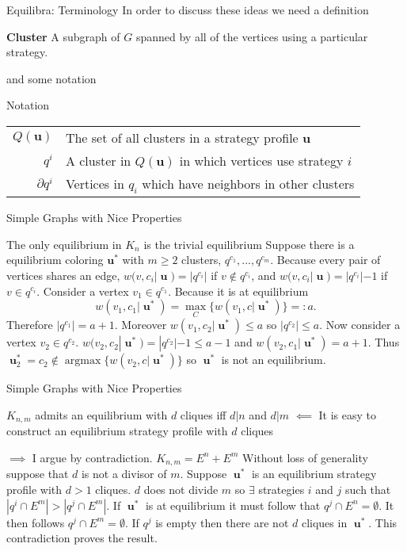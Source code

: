 \documentclass{beamer}
\DeclareMathOperator*{\argmax}{\text{argmax}}
\DeclareMathOperator{\uu}{\mathbf{u}}
\begin{document}
\begin{frame}
	{Equilibra: Terminology} %
	In order to discuss these ideas we need a definition
	\begin{block}{\textbf{Cluster}}
		A subgraph of $G$ spanned by all of the vertices using a particular strategy. 
	\end{block}  
	and some notation
	\begin{block}{Notation}
		\begin{tabular}{rp{9cm}} 
			$Q(\mathbf{u})$& The set of all clusters in a strategy profile $\mathbf{u}$ \\
			$q^i$& A cluster in $Q(\mathbf{u})$ in which vertices use strategy $i$\\
			$\partial q^i$& Vertices in $q_i$ which have neighbors in other clusters\\
		\end{tabular}
	\end{block}
\end{frame} 	
\begin{frame}{Simple Graphs with Nice Properties}
	\begin{block}{The only equilibrium in $K_n$ is the trivial equilibrium}
		Suppose there is a equilibrium coloring $\mathbf{u^*}$ with $m\geq2$ clusters, $q^{c_1},...,q^{c_m}$. Because every pair of vertices shares an edge, $w(v,c_i|\uu)=|q^{c_i}|$ if $v\notin q^{c_i}$, and $w(v,c_i|\uu)=|q^{c_i}|-1$ if $v\in q^{c_i}$.  Consider a vertex $v_1\in q^{c_1}$. Because it is at equilibrium $$w(v_1,c_1|\uu^*)=\max_C\{w(v_1,c|\uu^*)\}=:a.$$
		Therefore $|q^{c_1}|=a+1$. Moreover $w(v_1,c_2|\uu^*)\leq a$ so $|q^{c_2}|\leq a$.
		Now consider a vertex  $v_2\in q^{c_2}$. $w(v_2,c_2|\uu^*)=|q^{c_2}|-1\leq a-1$ and $w(v_2,c_1|\uu^*)=a+1$. 
		Thus $\uu^*_2=c_2\notin \argmax\{w(v_2,c|\uu^*)\}$ so $\uu^*$ is not an equilibrium.  
	\end{block}
\end{frame}

\begin{frame}{Simple Graphs with Nice Properties}
	\begin{block}{$K_{n,m}$ admits an equilibrium with $d$ cliques iff $d|n$ and $d|m$}
		$\impliedby$ It is easy to construct an equilibrium strategy profile with $d$ cliques
		
		$\implies$ I argue by contradiction. $K_{n,m}=E^n+E^m$  Without loss of generality suppose that $d$ is not a divisor of $m$. Suppose $\uu^*$ is an equilibrium strategy profile with $d>1$ cliques. $d$ does not divide $m$ so $\exists$ strategies $i$ and $j$ such that $|q^i\cap E^m|>|q^j\cap E^m|$. If $\uu^*$ is at equilibrium it must follow that $q^j\cap E^n=\emptyset$. It then follows $q^j\cap E^m =\emptyset$. If $q^j$ is empty then there are not $d$ cliques in $\uu^*$. This contradiction proves the result.   
	\end{block}
\end{frame}
\end{document}
